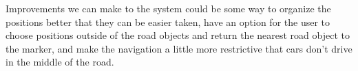 \begin{flushleft}
Improvements we can make to the system could be some way to organize the positions better that they can be easier taken, have an option for the user to choose positions outside of the road objects and return the nearest road object to the marker, and make the navigation a little more restrictive that cars don't drive in the middle of the road.
 \end{flushleft}